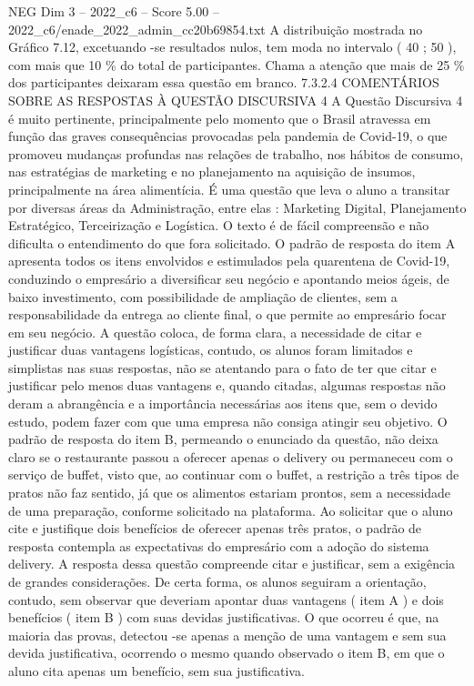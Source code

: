 \begin{textsample}{NEG Dim 3 – 2022\_c6 – Score 5.00 – 2022\_c6/enade\_2022\_admin\_cc20b69854.txt}
A distribuição mostrada no Gráfico 7.12, excetuando -se resultados nulos, tem moda no intervalo ( 40 ; 50 ), com mais que 10 \% do total de participantes.
Chama a atenção que mais de 25 \% dos participantes deixaram essa questão em branco. 7.3.2.4 COMENTÁRIOS SOBRE AS RESPOSTAS À QUESTÃO DISCURSIVA 4 A Questão Discursiva 4 é muito pertinente, principalmente pelo momento que o Brasil atravessa em função das graves consequências provocadas pela pandemia de Covid-19, o que promoveu mudanças profundas nas relações de trabalho, nos hábitos de consumo, nas estratégias de marketing e no planejamento na aquisição de insumos, principalmente na área alimentícia.
É uma questão que leva o aluno a transitar por diversas áreas da Administração, entre elas : Marketing Digital, Planejamento Estratégico, Terceirização e Logística.
O texto é de fácil compreensão e não dificulta o entendimento do que fora solicitado.
O padrão de resposta do item A apresenta todos os itens envolvidos e estimulados pela quarentena de Covid-19, conduzindo o empresário a diversificar seu negócio e apontando meios ágeis, de baixo investimento, com possibilidade de ampliação de clientes, sem a responsabilidade da entrega ao cliente final, o que permite ao empresário focar em seu negócio.
A questão coloca, de forma clara, a necessidade de citar e justificar duas vantagens logísticas, contudo, os alunos foram limitados e simplistas nas suas respostas, não se atentando para o fato de ter que citar e justificar pelo menos duas vantagens e, quando citadas, algumas respostas não deram a abrangência e a importância necessárias aos itens que, sem o devido estudo, podem fazer com que uma empresa não consiga atingir seu objetivo.
O padrão de resposta do item B, permeando o enunciado da questão, não deixa claro se o restaurante passou a oferecer apenas o delivery ou permaneceu com o serviço de buffet, visto que, ao continuar com o buffet, a restrição a três tipos de pratos não faz sentido, já que os alimentos estariam prontos, sem a necessidade de uma preparação, conforme solicitado na plataforma.
Ao solicitar que o aluno cite e justifique dois benefícios de oferecer apenas três pratos, o padrão de resposta contempla as expectativas do empresário com a adoção do sistema delivery.
A resposta dessa questão compreende citar e justificar, sem a exigência de grandes considerações.
De certa forma, os alunos seguiram a orientação, contudo, sem observar que deveriam apontar duas vantagens ( item A ) e dois benefícios ( item B ) com suas devidas justificativas.
O que ocorreu é que, na maioria das provas, detectou -se apenas a menção de uma vantagem e sem sua devida justificativa, ocorrendo o mesmo quando observado o item B, em que o aluno cita apenas um benefício, sem sua justificativa.

\end{textsample}
